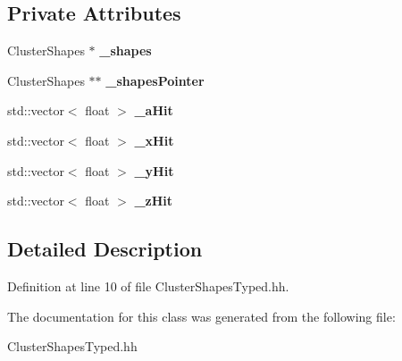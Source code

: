 \subsection*{Private Attributes}
\begin{DoxyCompactItemize}
\item 
Cluster\-Shapes $\ast$ {\bfseries \-\_\-shapes}\label{classCALICE_1_1ClusterShapesTyped_abefd2921e7b46295049038249a341e0c}

\item 
Cluster\-Shapes $\ast$$\ast$ {\bfseries \-\_\-shapes\-Pointer}\label{classCALICE_1_1ClusterShapesTyped_ab876f0147f6c5637461214d6373ba5ab}

\item 
std\-::vector$<$ float $>$ {\bfseries \-\_\-a\-Hit}\label{classCALICE_1_1ClusterShapesTyped_aa04563ae806937cc66e2ea67c7793449}

\item 
std\-::vector$<$ float $>$ {\bfseries \-\_\-x\-Hit}\label{classCALICE_1_1ClusterShapesTyped_a4392fd32a786c63115624cb82218c509}

\item 
std\-::vector$<$ float $>$ {\bfseries \-\_\-y\-Hit}\label{classCALICE_1_1ClusterShapesTyped_ac7e0b672703cd19d2327a774d2472bf7}

\item 
std\-::vector$<$ float $>$ {\bfseries \-\_\-z\-Hit}\label{classCALICE_1_1ClusterShapesTyped_acd58104f72c22a4d34b3455c17fc361c}

\end{DoxyCompactItemize}


\subsection{Detailed Description}


Definition at line 10 of file Cluster\-Shapes\-Typed.\-hh.



The documentation for this class was generated from the following file\-:\begin{DoxyCompactItemize}
\item 
Cluster\-Shapes\-Typed.\-hh\end{DoxyCompactItemize}
